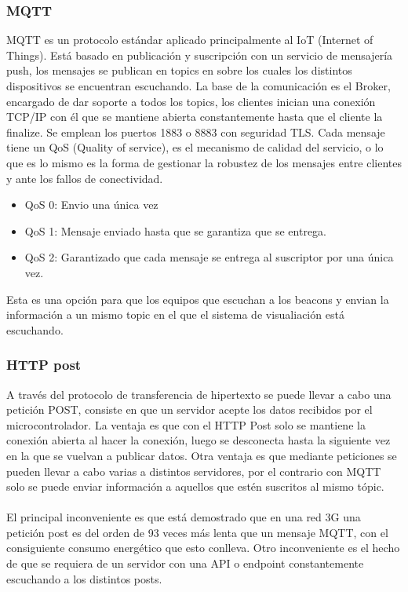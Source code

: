 \documentclass[paper=a4, fontsize=11pt,twoside]{scrartcl}	%
\begin{document}
\begin{enumerate}
        \subsubsection {MQTT}
            MQTT es un protocolo estándar aplicado principalmente al IoT (Internet of Things). Está basado en publicación y 
            suscripción con un servicio de mensajería push, los mensajes se publican en topics en sobre los cuales los distintos 
            dispositivos se encuentran escuchando.
            La base de la comunicación es el Broker, encargado de dar soporte a todos los topics, los clientes inician una 
            conexión TCP/IP con él que se mantiene abierta constantemente hasta que el cliente la finalize. Se emplean los puertos
            1883 o 8883 con seguridad TLS.
            Cada mensaje tiene un QoS (Quality of service), es el mecanismo de calidad del servicio, o lo que es lo mismo es la forma de
            gestionar la robustez de los mensajes entre clientes  y ante los fallos de conectividad.
            \begin{itemize}
                \item QoS 0: Envio una única vez
                \item QoS 1: Mensaje enviado hasta que se garantiza que se entrega.
                \item QoS 2: Garantizado que cada mensaje se entrega al suscriptor por una única vez.
            \end{itemize}
            Esta es una opción para que los equipos que escuchan a los beacons y envian la información a un mismo
            topic en el que el sistema de visualiación está escuchando.
        \subsubsection {HTTP post}
            A través del protocolo de transferencia de hipertexto se puede llevar a cabo una petición POST, consiste en que
            un servidor acepte los datos recibidos por el microcontrolador.
            La ventaja es que con el HTTP Post solo se mantiene la conexión abierta al hacer la conexión, luego se desconecta hasta 
            la siguiente vez en la que se vuelvan a publicar datos. Otra ventaja es que mediante peticiones se pueden llevar a 
            cabo varias a distintos servidores, por el contrario con MQTT solo se puede enviar información a aquellos que estén
            suscritos al mismo tópic.
            \paragraph{}
            El principal inconveniente es que está demostrado que en una red 3G una petición post es del orden de 93 veces
            más lenta que un mensaje MQTT, con el consiguiente consumo energético que esto conlleva. Otro inconveniente es el hecho 
            de que se requiera de un servidor con una API o endpoint constantemente escuchando a los distintos posts.

\end{enumerate}
\end{document}
